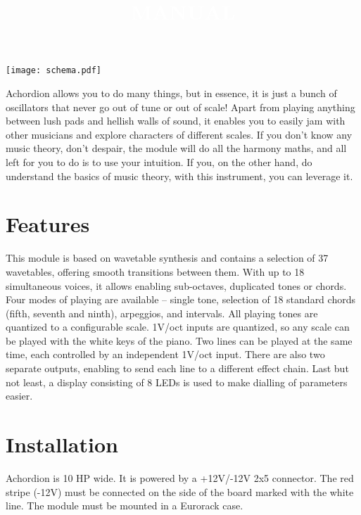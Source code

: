 \documentclass[10pt,nofoldmark,nocombine]{leaflet} %
\begin{document}
\title{\textcolor{white}{MANUAL}}
\author{}
\date{}
\maketitle

\begin{center}
  \texttt{[image: schema.pdf]}
\end{center}

\newpage

\vspace{5mm}

Achordion allows you to do many things, but in essence, it is just a bunch of oscillators that never go out of tune or out of scale! Apart from playing anything between lush pads and hellish walls of sound, it enables you to easily jam with other musicians and explore characters of different scales. If you don't know any music theory, don't despair, the module will do all the harmony maths, and all left for you to do is to use your intuition. If you, on the other hand, do understand the basics of music theory, with this instrument, you can leverage it.

\section{Features}

This module is based on wavetable synthesis and contains a selection of 37 wavetables, offering smooth transitions between them. With up to 18 simultaneous voices, it allows enabling sub-octaves, duplicated tones or chords. Four modes of playing are available – single tone, selection of 18 standard chords (fifth, seventh and ninth), arpeggios, and intervals. All playing tones are quantized to a configurable scale. 1V/oct inputs are quantized, so any scale can be played with the white keys of the piano. Two lines can be played at the same time, each controlled by an independent 1V/oct input. There are also two separate outputs, enabling to send each line to a different effect chain. Last but not least, a display consisting of 8 LEDs is used to make dialling of parameters easier.

\section{Installation}

Achordion is 10 HP wide. It is powered by a +12V/-12V 2x5 connector. The red stripe (-12V) must be connected on the side of the board marked with the white line. The module must be mounted in a Eurorack case.
\end{document}
